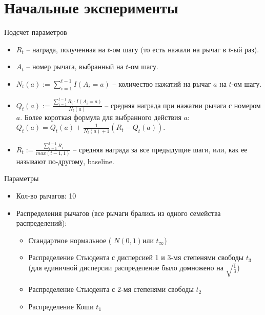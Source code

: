 \documentclass[11pt]{beamer} %
\begin{document}
\section{Начальные эксперименты}
    \begin{frame}{Подсчет параметров}
        \begin{itemize}
            \item<1-> $R_t$ -- награда, полученная на $t$-ом шагу (то есть нажали на рычаг в $t$-ый раз).
            \item<2-> $A_t$ -- номер рычага, выбранный на $t$-ом шагу.
            \item $N_t(a) := \sum_{i=1}^{t-1} I(A_i = a)$ -- количество нажатий на рычаг $a$ на $t$-ом шагу. 
            \item<3-> $Q_t(a) := \frac{\sum_{i=1}^{t-1} R_i \cdot I(A_i = a)}{N_t(a)}$ -- средняя награда при нажатии рычага с номером $a$. Более короткая формула для выбранного действия $a$: $Q_t(a) = Q_t(a) + \frac{1}{N_{t}(a) + 1}(R_t - Q_t(a))$.
            \item<4-> $\bar{R_t} := \frac{\sum_{i=1}^{t-1} R_i}{max(t-1,1)}$ -- средняя награда за все предыдущие шаги, или, как ее называют по-другому, baseline.
        \end{itemize}
    \end{frame}
    \begin{frame}{Параметры}
        
        \begin{itemize}
            \item<1-3> Кол-во рычагов: 10
            \item<2-3> Распределения рычагов (все рычаги брались из одного семейства распределений):
            \begin{itemize}
                \item Стандартное нормальное ( $N (0,1)$или $t_{\infty}$)
                \item Распределение Стьюдента с дисперсией 1 и 3-мя степенями свободы $t_3$ (для единичной дисперсии распределение было домножено на $\sqrt{\frac{1}{3}}$)
                \item Распределение Стьюдента с 2-мя степенями свободы $t_2$
                \item Распределение Коши $t_1$
            \end{itemize}
        \end{itemize}
    \end{frame}
\end{document}
